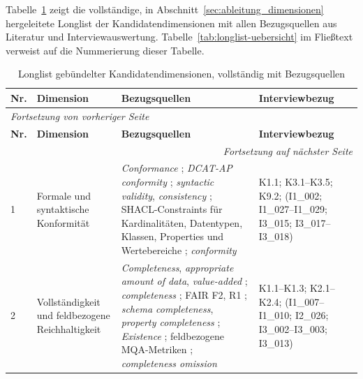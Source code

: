 Tabelle~\ref{tab:longlist-kandidatendimensionen} zeigt die vollständige, in Abschnitt~\ref{sec:ableitung_dimensionen} hergeleitete Longlist der Kandidatendimensionen mit allen Bezugsquellen aus Literatur und Interviewauswertung. Tabelle~\ref{tab:longlist-uebersicht} im Fließtext verweist auf die Nummerierung dieser Tabelle.

\begin{center}
\footnotesize
\renewcommand{\arraystretch}{0.9}
\begin{longtable}{p{} p{} p{} p{}}
\caption{Longlist gebündelter Kandidatendimensionen, vollständig mit Bezugsquellen}
\label{tab:longlist-kandidatendimensionen}\\
\toprule
\textbf{Nr.} & \textbf{Dimension} & \textbf{Bezugsquellen} & \textbf{Interviewbezug} \\
\midrule
\endfirsthead

\multicolumn{4}{l}{\textit{Fortsetzung von vorheriger Seite}} \\
\toprule
\textbf{Nr.} & \textbf{Dimension} & \textbf{Bezugsquellen} & \textbf{Interviewbezug} \\
\midrule
\endhead

\midrule
\multicolumn{4}{r}{\textit{Fortsetzung auf nächster Seite}} \\
\endfoot

\bottomrule
\endlastfoot

1 &
Formale und syntaktische Konformität &
\textit{Conformance} \cite{Neumaier2016MetadataQuality}; \textit{DCAT-AP conformity} \cite{wentzel2023extensive,data_europa}; \textit{syntactic validity}, \textit{consistency} \cite{Zaveri2016LinkedDataQuality}; SHACL-Constraints für Kardinalitäten, Datentypen, Klassen, Properties und Wertebereiche \cite{W3CSHACL}; \textit{conformity} \cite{iso25012} &
K1.1; K3.1--K3.5; K9.2; (I1\_002; I1\_027--I1\_029; I3\_015; I3\_017--I3\_018) \\ \hline

2 &
Vollständigkeit und feldbezogene Reichhaltigkeit &
\textit{Completeness}, \textit{appropriate amount of data}, \textit{value-added} \cite{wang1996beyond}; \textit{completeness} \cite{iso25012}; FAIR F2, R1 \cite{wilkinson2016fair}; \textit{schema completeness}, \textit{property completeness} \cite{Zaveri2016LinkedDataQuality}; \textit{Existence} \cite{Neumaier2016MetadataQuality}; feldbezogene MQA-Metriken \cite{wentzel2023extensive,data_europa}; \textit{completeness omission} \cite{noguerasiso_quality_metadata} &
K1.1--K1.3; K2.1--K2.4; (I1\_007--I1\_010; I2\_026; I3\_002--I3\_003; I3\_013) \\ \hline


\end{longtable}
\end{center}
